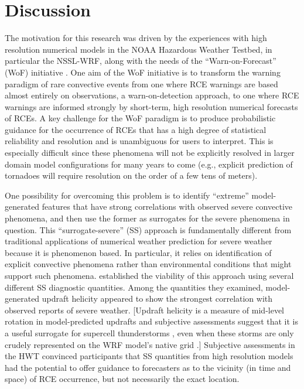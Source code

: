 

\chapter{Discussion}
\label{discussion}


The motivation for this research was driven by the experiences with high resolution numerical models in the NOAA Hazardous Weather Testbed, in particular the NSSL-WRF, along with the needs of the ``Warn-on-Forecast'' (WoF) initiative \citep{Stensrud2009}.
One aim of the WoF initiative is to transform the warning paradigm of rare convective events from one where RCE warnings are based almost entirely on observations, a warn-on-detection approach, to one where RCE warnings are informed strongly by short-term, high resolution numerical forecasts of RCEs.
A key challenge for the WoF paradigm is to produce probabilistic guidance for the occurrence of RCEs that has a high degree of statistical reliability and resolution and is unambiguous for users to interpret.
This is especially difficult since these phenomena will not be explicitly resolved in larger domain model configurations for many years to come (e.g., explicit prediction of tornadoes will require resolution on the order of a few tens of meters).


One possibility for overcoming this problem is to identify ``extreme'' model-generated features that have strong correlations with observed severe convective phenomena, and then use the former as surrogates for the severe phenomena in question.
This ``surrogate-severe'' (SS) approach is fundamentally different from traditional applications of numerical weather prediction for severe weather because it is phenomenon based.
In particular, it relies on identification of explicit convective phenomena rather than environmental conditions that might support such phenomena.
\cite{Sobash2011} established the viability of this approach using several different SS diagnostic quantities.
Among the quantities they examined, model-generated updraft helicity appeared to show the strongest correlation with observed reports of severe weather.
[Updraft helicity is a measure of mid-level rotation in model-predicted updrafts and subjective assessments suggest that it is a useful surrogate for supercell thunderstorms \citep{Kain2010}, even when these storms are only crudely represented on the WRF model's native grid \citep{Kain2008}.]
Subjective assessments in the HWT convinced participants that SS quantities from high resolution models had the potential to offer guidance to forecasters as to the vicinity (in time and space) of RCE occurrence, but not necessarily the exact location.


